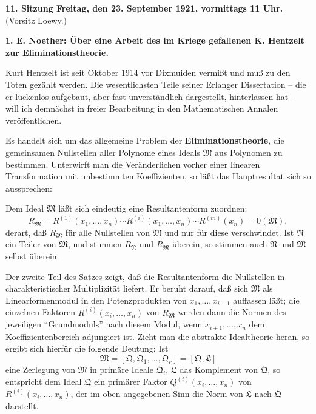 \documentclass[11pt]{article}
\begin{document}
\begin{center}
\textbf{11. Sitzung Freitag, den 23. September 1921, vormittags 11 Uhr.}\\
(Vorsitz Loewy.)
\end{center}

\textbf{1. E. Noether: Über eine Arbeit des im Kriege gefallenen K. Hentzelt zur Eliminationstheorie.}

Kurt Hentzelt ist seit Oktober 1914 vor Dixmuiden vermißt und muß zu den Toten gezählt werden. Die wesentlichsten Teile seiner Erlanger Dissertation -- die er lückenlos aufgebaut, aber fast unverständlich dargestellt, hinterlassen hat -- will ich demnächst in freier Bearbeitung in den Mathematischen Annalen veröffentlichen.

Es handelt sich um das allgemeine Problem der \textbf{Eliminationstheorie}, die gemeinsamen Nullstellen aller Polynome eines Ideals $\mathfrak M$ aus Polynomen zu bestimmen. Unterwirft man die Veränderlichen vorher einer linearen Transformation mit unbestimmten Koeffizienten, so läßt das Hauptresultat sich so aussprechen:

Dem Ideal $\mathfrak M$ läßt sich eindeutig eine Resultantenform zuordnen:
\[
 R_{\mathfrak M}=R^{(1)}(x_1,
\ldots,x_n)\cdots R^{(i)}(x_1,
\ldots,x_n)\cdots R^{(m)}(x_n)=0(\mathfrak M),
\]
derart, daß $R_{\mathfrak M}$ für alle Nullstellen von $\mathfrak M$ und nur für diese verschwindet. Ist $\mathfrak N$ ein Teiler von $\mathfrak M$, und stimmen $R_{\mathfrak N}$ und $R_{\mathfrak M}$ überein, so stimmen auch $\mathfrak N$ und $\mathfrak M$ selbst überein.

Der zweite Teil des Satzes zeigt, daß die Resultantenform die Nullstellen in charakteristischer Multiplizität liefert. Er beruht darauf, daß sich $\mathfrak M$ als Linearformenmodul in den Potenzprodukten von $x_1,
\ldots,x_{i-1}$ auffassen läßt; die einzelnen Faktoren $R^{(i)}(x_i,
\ldots,x_n)$ von $R_{\mathfrak M}$ werden dann die Normen des jeweiligen ``Grundmoduls'' nach diesem Modul, wenn $x_{i+1},
\ldots,x_n$ dem Koeffizientenbereich adjungiert ist. Zieht man die abstrakte Idealtheorie heran, so ergibt sich hierfür die folgende Deutung: Ist
\[
 \mathfrak M=[\mathfrak Q,\mathfrak Q_1,
\ldots,
\mathfrak Q_r]=[\mathfrak Q,\mathfrak L]
\]
eine Zerlegung von $\mathfrak M$ in primäre Ideale $\mathfrak Q_i$, $\mathfrak L$ das Komplement von $\mathfrak Q$, so entspricht dem Ideal $\mathfrak Q$ ein primärer Faktor $Q^{(i)}(x_i,
\ldots,x_n)$ von $R^{(i)}(x_i,
\ldots,x_n)$, der im oben angegebenen Sinn die Norm von $\mathfrak L$ nach $\mathfrak Q$ darstellt.
\end{document}
